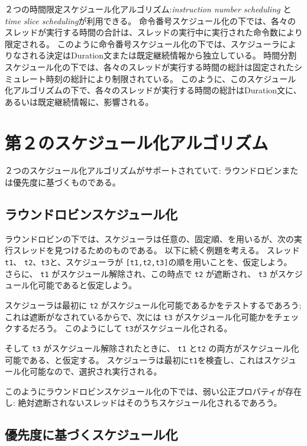 \documentclass[\pformat,12pt]{jreport}
\begin{document}
２つの時間限定スケジュール化アルゴリズム:\emph{instruction number scheduling} と \emph{time slice scheduling}が利用できる。
命令番号スケジュール化の下では、各々のスレッドが実行する時間の合計は、スレッドの実行中に実行された命令数により限定される。
このように命令番号スケジュール化の下では、スケジューラによりなされる決定はDuration文または既定継続情報から独立している。
時間分割スケジュール化の下では、各々のスレッドが実行する時間の総計は固定されたシミュレート時刻の総計により制限されている。
このように、このスケジュール化アルゴリズムの下で、各々のスレッドが実行する時間の総計はDuration文に、あるいは既定継続情報に、影響される。

\section{第２のスケジュール化アルゴリズム}

２つのスケジュール化アルゴリズムがサポートされていて: ラウンドロビンまたは優先度に基づくものである。

\subsection{ラウンドロビンスケジュール化}

ラウンドロビンの下では、スケジューラは任意の、固定順、を用いるが、次の実行スレッドを見つけるためのものである。
以下に続く例題を考える。
スレッド \texttt{t1}、 \texttt{t2}、\texttt{t3}と、スケジューラが \texttt{[t1,t2,t3]}の順を用いことを、仮定しよう。 
さらに、 \texttt{t1} がスケジュール解除され、この時点で \texttt{t2} が遮断され、 \texttt{t3} がスケジュール化可能であると仮定しよう。

スケジューラは最初に \texttt{t2} がスケジュール化可能であるかをテストするであろう;
これは遮断がなされているからで、次には \texttt{t3} がスケジュール化可能かをチェックするだろう。
このようにして \texttt{t3}がスケジュール化される。

そして \texttt{t3} がスケジュール解除されたときに、 \texttt{t1} と\texttt{t2} の両方がスケジュール化可能である、と仮定する。
スケジューラは最初に\texttt{t1}を検査し、これはスケジュール化可能なので、選択され実行される。

このようにラウンドロビンスケジュール化の下では、弱い公正プロパティが存在し\cite{Lamport91}: 絶対遮断されないスレッドはそのうちスケジュール化されるであろう。

\subsection{優先度に基づくスケジュール化}
\end{document}
